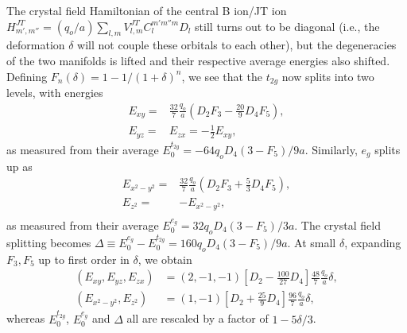 \documentclass[a4paper,prb]{revtex4-1}  %
\newcommand{\com}[1]{}
\newcommand{\ylm}[1]{Y_{#1}(\hat r)}
\begin{document}
\com{
At $\delta=0$, keeping only the non-spherical components, 
we obtain the
 octahedral potential for a symmetric octahedron~\cite{pavariniChap},
\begin{align}
\label{eq:voct}
\lim_{\delta\to0}V^{JT}(\vec r) \to V_{oct}(\vec r) = -\frac{224\sqrt{\pi}}{3}\frac{q_o}{a} \left(\frac{r}{a}\right)^4\left[\ylm{4,0}+\sqrt{\frac{5}{7}}\ylm{4,4} \right],
\end{align}
}


The crystal field Hamiltonian of the central B ion/JT ion
${H_{m',m''}^{JT} = (q_o/a)\sum_{l,m} V_{l,m}^{JT} C_{l}^{m'm''m} D_{l}}$
still turns out to be diagonal 
(i.e., the deformation $\delta$
will not couple these orbitals to each other),
but the degeneracies of the two manifolds is lifted
and their respective average energies also shifted.
Defining 
$F_n(\delta) = 1-1/(1+\delta)^n$,
we see that
the $t_{2g}$ now splits into two levels,
with energies
\begin{align}
E_{xy} =&
\frac{32}{7}\frac{q_o}{a} \left(
 D_2F_3 - \frac{20}{9}D_4F_5 
\right),\\
E_{yz} =& E_{zx} = -\frac{1}{2} E_{xy},
\end{align}
as measured from their average 
$E_0^{t_{2g}} = -64q_oD_4 \left(3-F_5\right)/9a$.
Similarly, $e_g$ splits up as
\begin{align}
E_{x^2-y^2}=&
\frac{32}{7}\frac{q_o}{a} \left(D_2F_3+\frac{5}{3} D_4F_5\right),\\
E_{z^2}=&-E_{x^2-y^2},\\
\end{align}
as measured from their average 
$E_0^{e_{g}} = 32 q_oD_4 \left(3-F_5\right)/3a$.
The crystal field splitting becomes
$\Delta \equiv E_0^{e_{g}}-E_0^{t_{2g}}=
160q_oD_4\left(3-F_5\right)/9a$.
At small $\delta$, 
expanding 
$F_3,F_5$
 up to first order in $\delta$,
we obtain
\begin{align}
\label{eq:JTt2g}
(E_{xy},E_{yz},E_{zx})&= (2, -1, -1)
\left[D_2-\frac{100}{27}  D_4\right]\frac{48}{7}\frac{q_o}{a}\delta,\\
\label{eq:JTeg}
(E_{x^2-y^2},E_{z^2})&=(1,-1)
\left[D_2+\frac{25}{9} D_4\right]\frac{96}{7}\frac{q_o}{a}\delta,
\end{align}
whereas
$E_0^{t_{2g}}$, $E_0^{e_{g}}$ and $\Delta$ all are rescaled by a factor of ${1-5\delta/3}$.


\com{
The crystal field splitting becomes
\begin{align}
E_0^{t_{2g}},E_0^{e_{g}},\Delta \to (1-\frac{5}{3}\delta)E_0^{t_{2g}}
E_0^{e_{g}} \to (1-\frac{5}{3}\delta) E_0^{e_{g}}
\Delta \to (1-\frac{5}{3}\delta)\Delta
\end{align}
}
\end{document}
